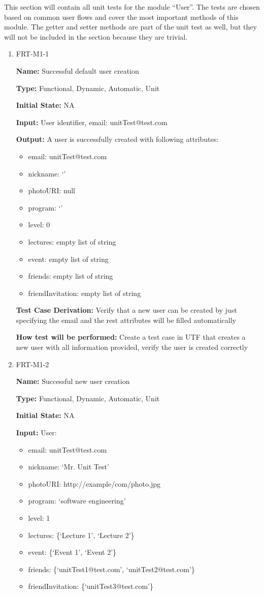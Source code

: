 \documentclass[12pt, titlepage]{article}
\begin{document}
This section will contain all unit tests for the module ``User''. The tests are chosen based on common user flows and cover the most important methods of this module. The getter and setter methods are part of the unit test as well, but they will not be included in the section because they are trivial.

\begin{enumerate}

\item{FRT-M1-1}

\textbf{Name:} Successful default user creation

\textbf{Type:} Functional, Dynamic, Automatic, Unit
					
\textbf{Initial State:} NA
					
\textbf{Input:} User identifier, email: unitTest@test.com
					
\textbf{Output:} A user is successfully created with following attributes:
\begin{itemize}
\item email: unitTest@test.com
\item nickname: `'
\item photoURI: null
\item program: `'
\item level: 0
\item lectures: empty list of string
\item event: empty list of string
\item friends: empty list of string
\item friendInvitation: empty list of string
\end{itemize}

\textbf{Test Case Derivation:} Verify that a new user can be created by just specifying the email and the rest attributes will be filled automatically

\textbf{How test will be performed:} Create a test case in UTF that creates a new user with all information provided, verify the user is created correctly

\item{FRT-M1-2}

\textbf{Name:} Successful new user creation

\textbf{Type:} Functional, Dynamic, Automatic, Unit
					
\textbf{Initial State:} NA
					
\textbf{Input:} User:
\begin{itemize}
\item email: unitTest@test.com
\item nickname: `Mr. Unit Test'
\item photoURI: http://example/com/photo.jpg
\item program: `software engineering'
\item level: 1
\item lectures: \{`Lecture 1', `Lecture 2'\}
\item event: \{`Event 1', `Event 2'\}
\item friends: \{`unitTest1@test.com', `unitTest2@test.com'\}
\item friendInvitation: \{`unitTest3@test.com'\}
\end{itemize}
					

\end{enumerate}
\end{document}
